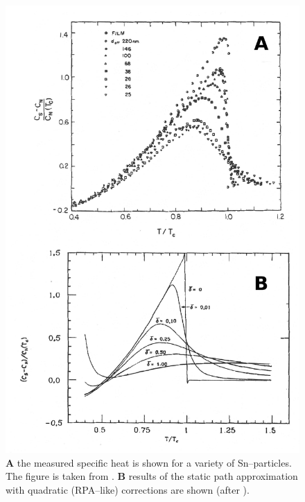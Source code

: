 \begin{figure}[h!]
	\centerline{\includegraphics*[width=12cm,angle=0]{nutshell/figs/fig2E2.pdf}}
	\caption{ \textbf{A} the measured specific heat is shown for a variety of Sn--particles. The figure is taken from \cite{Tsuboi:77}. \textbf{B}  results of the static path approximation with quadratic (RPA--like) corrections  are shown (after \cite{Lauritzen:93}).}\label{fig2.E.2}
\end{figure}

